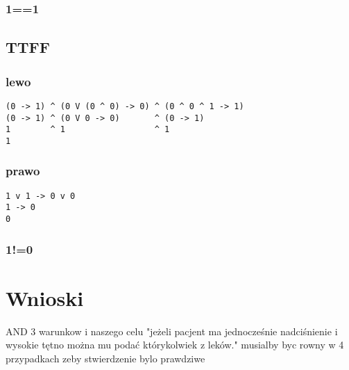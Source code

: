 \documentclass[11pt]{article}
\begin{document}
\subsubsection{1==1}
\label{sec:orgb635160}
\subsection{TTFF}
\label{sec:org3fe4ab0}
\subsubsection{lewo}
\label{sec:org1c9def0}
\begin{verbatim}
(0 -> 1) ^ (0 V (0 ^ 0) -> 0) ^ (0 ^ 0 ^ 1 -> 1)
(0 -> 1) ^ (0 V 0 -> 0)       ^ (0 -> 1)
1        ^ 1                  ^ 1
1
\end{verbatim}
\subsubsection{prawo}
\label{sec:org2ab0bae}
\begin{verbatim}
1 v 1 -> 0 v 0
1 -> 0
0
\end{verbatim}
\subsubsection{1!=0}
\label{sec:orgb225285}

\section{Wnioski}
\label{sec:org8c1bc06}
AND 3 warunkow i naszego celu "jeżeli pacjent ma jednocześnie nadciśnienie i wysokie tętno można mu podać
którykolwiek z leków." musialby byc rowny w 4 przypadkach zeby stwierdzenie bylo prawdziwe
\end{document}
